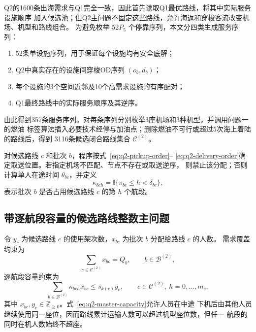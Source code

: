\documentclass[UTF8,a4paper,zihao=5]{ctexart}
\begin{document}
Q2的1600条出海需求与Q1完全一致，因此首先读取Q1最优路线，将其中实际服务设施顺序
加入候选池；但Q2主问题不固定这些路线，允许海返和穿梭客流改变机场、机型和路线组合。
为避免枚举 $52P_5$ 个停靠序列，本文分四类生成服务序列：
\begin{enumerate}[label=\arabic*.]
  \item 52条单设施序列，用于保证每个设施均有安全底解；
  \item Q2中真实存在的设施间穿梭OD序列 $(o_b,d_b)$；
  \item 每个设施的3个空间近邻及10个高需求设施的有序配对；
  \item Q1最终路线中的实际服务顺序及其逆序。
\end{enumerate}
由此得到357条服务序列。对每条序列分别枚举3座机场和3种机型，并调用问题一的燃油
标签算法插入必要技术经停与加油点；删除燃油不可行或超过5次海上着陆的路线后，得到
3116条候选闭合路线集合 $\mathcal C^{(2)}$。

对候选路线 $c$ 和批次 $b$，程序按式~\eqref{eq:q2-pickup-order}--
\eqref{eq:q2-delivery-order}确定取送位置。若指定机场不匹配、节点不存在或取送逆序，
则禁止该分配；否则计算单人在途时间 $\theta_{bc}$，并定义
\begin{equation}
  \kappa_{bch}=\mathbb I\{\pi_{bc}\le h<\delta_{bc}\},
  \label{eq:q2-onboard-indicator}
\end{equation}
表示批次 $b$ 是否占用候选路线 $c$ 的第 $h$ 个航段。

\subsection{带逐航段容量的候选路线整数主问题}

令 $y_c$ 为候选路线 $c$ 的使用架次数，$x_{bc}$ 为批次 $b$ 分配给路线 $c$ 的人数。
需求覆盖约束为
\begin{equation}
  \sum_{c\in\mathcal C^{(2)}}x_{bc}=Q_b,
  \qquad b\in\mathcal B^{(2)},
  \label{eq:q2-master-cover}
\end{equation}
逐航段容量约束为
\begin{equation}
  \sum_{b\in\mathcal B^{(2)}}\kappa_{bch}x_{bc}
  \le s_{k(c)}y_c,
  \qquad c\in\mathcal C^{(2)},\ h=0,\ldots,m_c,
  \label{eq:q2-master-capacity}
\end{equation}
其中 $x_{bc},y_c\in\mathbb Z_{\ge0}$。式~\eqref{eq:q2-master-capacity}允许人员在中途
下机后由其他人员继续使用同一座位，因而路线累计运输人数可以超过机型座位数，但任一
航段的同时在机人数始终不超座。
\end{document}
